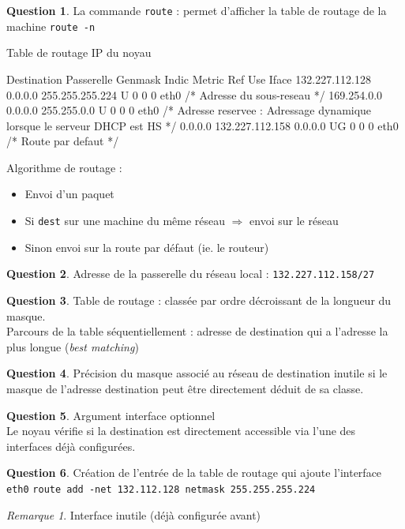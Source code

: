 \documentclass[11pt,english,french]{scrreprt}
\theoremstyle{remark}
\newtheorem*{rem*}{Remarque}
\theoremstyle{definition}
\newtheorem{ques*}{Question}[subsection]
\begin{document}
\begin{ques*}
	La commande \lstinline!route! : permet d'afficher la table de routage de la machine
	\lstinline!route -n!

Table de routage IP du noyau
\begin{verbatimtab}[4]
Destination		Passerelle		Genmask			Indic Metric Ref	Use	Iface
132.227.112.128	0.0.0.0 		255.255.255.224 U	  0		 0 		0 	eth0  
/* Adresse du sous-reseau */
169.254.0.0     0.0.0.0			255.255.0.0		U	  0		 0		0	eth0	
/* Adresse reservee : Adressage dynamique lorsque le serveur DHCP est HS */
0.0.0.0			132.227.112.158	0.0.0.0			UG	  0 	 0		0	eth0	
/* Route par defaut */
\end{verbatimtab}
	
	Algorithme de routage :\begin{itemize}
		\item Envoi d'un paquet
		\item Si \lstinline!dest! sur une machine du même réseau $\Rightarrow$ envoi sur le réseau
		\item Sinon envoi sur la route par défaut (ie. le routeur)
	\end{itemize}
\end{ques*}

\begin{ques*}
Adresse de la passerelle du réseau local : \lstinline!132.227.112.158/27!
\end{ques*}


\begin{ques*}
Table de routage : classée par ordre décroissant de la longueur du masque.\\
	Parcours de la table séquentiellement : adresse de destination qui a l'adresse la plus longue (\emph{best matching})
\end{ques*}


\begin{ques*}
	Précision du masque associé au réseau de destination inutile si le masque de l'adresse  destination peut être directement déduit de sa classe.
\end{ques*}

\begin{ques*}
	Argument interface optionnel\\
	Le noyau vérifie si la destination est directement accessible via l'une des interfaces déjà configurées.
\end{ques*}


\begin{ques*}
	Création de l'entrée de la table de routage qui ajoute l'interface \lstinline!eth0!
	\lstinline!route add -net 132.112.128 netmask 255.255.255.224!
	
	\begin{rem*}
		Interface inutile (déjà configurée avant)
	\end{rem*}
\end{ques*}
\end{document}
